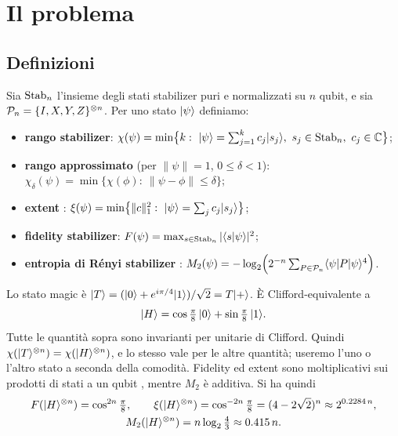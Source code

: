 \section{Il problema}\label{sec:problem}

\subsection{Definizioni}
Sia $\mathrm{Stab}_n$ l'insieme degli stati stabilizer puri e normalizzati su $n$ qubit, e sia $\mathcal P_n=\{I,X,Y,Z\}^{\otimes n}$. Per uno stato $\lvert \psi\rangle$ definiamo:
\begin{itemize}[leftmargin=1.5em]
\item \textbf{rango stabilizer}: $\chi(\psi)=\min\bigl\{k:\ \lvert \psi\rangle=\sum_{j=1}^k c_j\lvert s_j\rangle,\ s_j\in\mathrm{Stab}_n,\ c_j\in\mathbb C\bigr\}$;
\item \textbf{rango approssimato} (per $\|\psi\|=1$, $0\le\delta<1$): $\chi_\delta(\psi)=\min\{\chi(\phi):\ \|\psi-\phi\|\le\delta\}$;
\item \textbf{extent} \cite{BBCCGH19}: $\xi(\psi)=\min\bigl\{\|c\|_1^2:\ \lvert \psi\rangle=\sum_j c_j\lvert s_j\rangle\bigr\}$;
\item \textbf{fidelity stabilizer}: $F(\psi)=\max_{s\in\mathrm{Stab}_n}|\langle s\vert \psi\rangle|^2$;
\item \textbf{entropia di Rényi stabilizer} \cite{LOH22}: $M_2(\psi)=-\log_2\Bigl(2^{-n}\sum_{P\in\mathcal P_n}\langle \psi\rvert P\lvert \psi\rangle^4\Bigr)$.
\end{itemize}
Lo stato magic è $\lvert T\rangle=(\lvert 0\rangle+e^{i\pi/4}\lvert 1\rangle)/\sqrt2=T\lvert +\rangle$. È Clifford-equivalente a
\begin{equation}\label{eq:H}
\lvert H\rangle=\cos\tfrac\pi8\,\lvert 0\rangle+\sin\tfrac\pi8\,\lvert 1\rangle .
\end{equation}
Tutte le quantità sopra sono invarianti per unitarie di Clifford. Quindi $\chi(\lvert T\rangle^{\otimes n})=\chi(\lvert H\rangle^{\otimes n})$, e lo stesso vale per le altre quantità; useremo l'uno o l'altro stato a seconda della comodità. Fidelity ed extent sono moltiplicativi sui prodotti di stati a un qubit \cite{BBCCGH19}, mentre $M_2$ è additiva. Si ha quindi
\begin{equation}\label{eq:values}
\begin{gathered}
F(\lvert H\rangle^{\otimes n})=\cos^{2n}\tfrac\pi8,\qquad
\xi(\lvert H\rangle^{\otimes n})=\cos^{-2n}\tfrac\pi8=(4-2\sqrt2)^n\approx 2^{0.2284\,n},\\
M_2(\lvert H\rangle^{\otimes n})=n\log_2\tfrac43\approx 0.415\,n .
\end{gathered}
\end{equation}


